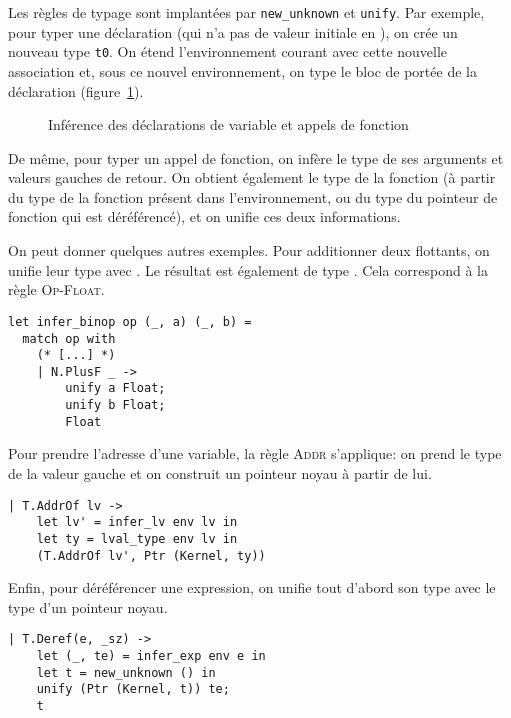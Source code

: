 Les règles de typage sont implantées par \texttt{new\_unknown} et
\texttt{unify}. Par exemple, pour typer une déclaration (qui n'a pas de valeur
initiale en \newspeak), on crée un nouveau type \texttt{t0}. On étend
l'environnement courant avec cette nouvelle association et, sous ce nouvel
environnement, on type le bloc de portée de la déclaration
(figure~\ref{fig:implem-unif-stmt}).

\begin{figure}[h] %


\caption{Inférence des déclarations de variable et appels de
         fonction}

\label{fig:implem-unif-stmt}
\end{figure}%

De même, pour typer un appel de fonction, on infère le type de ses arguments et
valeurs gauches de retour. On obtient également le type de la fonction (à partir
du type de la fonction présent dans l'environnement, ou du type du pointeur de
fonction qui est déréférencé), et on unifie ces deux informations.

On peut donner quelques autres exemples. Pour additionner deux flottants, on
unifie leur type avec \tFloat. Le résultat est également de type \tFloat. Cela
correspond à la règle \textsc{Op-Float}.

\begin{verbatim}
let infer_binop op (_, a) (_, b) =
  match op with
    (* [...] *)
    | N.PlusF _ ->
        unify a Float;
        unify b Float;
        Float
\end{verbatim}

Pour prendre l'adresse d'une variable, la règle \textsc{Addr} s'applique: on
prend le type de la valeur gauche et on construit un pointeur noyau à partir de
lui.

\begin{verbatim}
| T.AddrOf lv ->
    let lv' = infer_lv env lv in
    let ty = lval_type env lv in
    (T.AddrOf lv', Ptr (Kernel, ty))
\end{verbatim}

Enfin, pour déréférencer une expression, on unifie tout d'abord son type avec le
type d'un pointeur noyau.

\begin{verbatim}
| T.Deref(e, _sz) ->
    let (_, te) = infer_exp env e in
    let t = new_unknown () in
    unify (Ptr (Kernel, t)) te;
    t
\end{verbatim}

